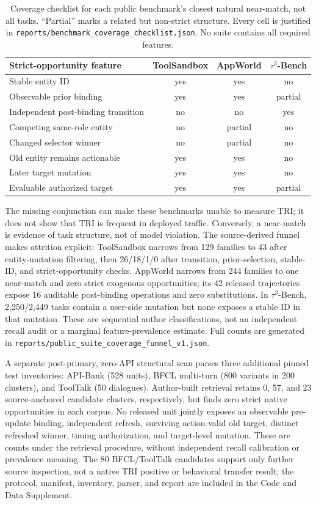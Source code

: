 \documentclass[10pt]{article}
\begin{document}
\begin{table}[h]
\centering
\scriptsize
\setlength{\tabcolsep}{3pt}
\begin{tabular}{lccc}
\toprule
Strict-opportunity feature & ToolSandbox & AppWorld & $\tau^3$-Bench \\
\midrule
Stable entity ID & yes & yes & no \\
Observable prior binding & yes & yes & partial \\
Independent post-binding transition & no & no & yes \\
Competing same-role entity & no & partial & no \\
Changed selector winner & no & partial & no \\
Old entity remains actionable & yes & yes & no \\
Later target mutation & yes & yes & no \\
Evaluable authorized target & yes & yes & partial \\
\bottomrule
\end{tabular}
\caption{Coverage checklist for each public benchmark's closest natural near-match, not all
tasks. ``Partial'' marks a related but non-strict structure. Every cell is justified in
\texttt{reports/benchmark\_coverage\_checklist.json}. No suite contains all required features.}
\label{tab:supp-coverage}
\end{table}

The missing conjunction can make these benchmarks unable to measure TRI; it does not show that
TRI is frequent in deployed traffic. Conversely, a near-match is evidence of task structure, not
of model violation. The source-derived funnel makes attrition explicit: ToolSandbox narrows from
129 families to 43 after entity-mutation filtering, then 26/18/1/0 after transition, prior-selection,
stable-ID, and strict-opportunity checks. AppWorld narrows from 244 families to one near-match and
zero strict exogenous opportunities; its 42 released trajectories expose 16 auditable post-binding
operations and zero substitutions. In $\tau^3$-Bench, 2,250/2,449 tasks contain a user-side mutation but
none exposes a stable ID in that mutation. These are sequential author classifications, not an
independent recall audit or a marginal feature-prevalence estimate. Full counts are generated in
\texttt{reports/public\_suite\_coverage\_funnel\_v1.json}.

A separate post-primary, zero-API structural scan parses three additional pinned test inventories:
API-Bank (528 units), BFCL multi-turn (800 variants in 200 clusters), and ToolTalk (50 dialogues).
Author-built retrieval retains 0, 57, and 23 source-anchored candidate clusters, respectively, but
finds zero strict native opportunities in each corpus. No released unit jointly exposes an observable
pre-update binding, independent refresh, surviving action-valid old target, distinct refreshed winner,
timing authorization, and target-level mutation. These are counts under the retrieval procedure,
without independent recall calibration or prevalence meaning. The 80 BFCL/ToolTalk candidates support
only further source inspection, not a native TRI positive or behavioral transfer result; the protocol,
manifest, inventory, parser, and report are included in the Code and Data Supplement.
\end{document}
